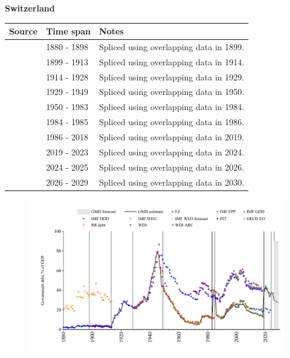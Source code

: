 \documentclass[12pt,a4paper,landscape]{article}
\begin{document}
\begin{adjustbox}{max totalsize={\paperwidth}{\paperheight},center}
\begin{minipage}[t][\textheight][t]{\textwidth}
\vspace*{0.5cm}
{}
\begin{center}
{\Large\bfseries Switzerland}
\end{center}
\vspace{0.5cm}
\begin{table}[H]
\centering
\small
\begin{tabular}{|l|l|l|}
\hline
\textbf{Source} & \textbf{Time span} & \textbf{Notes} \\
\hline
\rowcolor{white}\cite{JST}& 1880 - 1898 &Spliced using overlapping data in 1899.\\
\rowcolor{lightgray}\cite{IMF_FPP}& 1899 - 1913 &Spliced using overlapping data in 1914.\\
\rowcolor{white}\cite{JST}& 1914 - 1928 &Spliced using overlapping data in 1929.\\
\rowcolor{lightgray}\cite{IMF_FPP}& 1929 - 1949 &Spliced using overlapping data in 1950.\\
\rowcolor{white}\cite{IMF_GDD}& 1950 - 1983 &Spliced using overlapping data in 1984.\\
\rowcolor{lightgray}\cite{IMF_FPP}& 1984 - 1985 &Spliced using overlapping data in 1986.\\
\rowcolor{white}\cite{IMF_GDD}& 1986 - 2018 &Spliced using overlapping data in 2019.\\
\rowcolor{lightgray}\cite{IMF_FPP}& 2019 - 2023 &Spliced using overlapping data in 2024.\\
\rowcolor{white}\cite{OECD_EO}& 2024 - 2025 &Spliced using overlapping data in 2026.\\
\rowcolor{lightgray}\cite{IMF_WEO_forecast}& 2026 - 2029 &Spliced using overlapping data in 2030.\\
\hline
\end{tabular}
\end{table}
\begin{figure}[H]
\centering
\includegraphics[width=\textwidth,height=0.6\textheight,keepaspectratio]{graphs/CHE_govdebt_GDP.pdf}
\end{figure}
\end{minipage}
\end{adjustbox}
\end{document}
